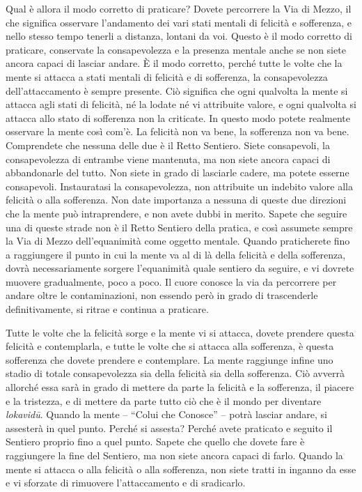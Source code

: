 Qual è allora il modo corretto di praticare? Dovete percorrere la Via di
Mezzo, il che significa osservare l'andamento dei vari stati mentali di
felicità e sofferenza, e nello stesso tempo tenerli a distanza, lontani
da voi. Questo è il modo corretto di praticare, conservate la
consapevolezza e la presenza mentale anche se non siete ancora capaci di
lasciar andare. È il modo corretto, perché tutte le volte che la mente
si attacca a stati mentali di felicità e di sofferenza, la
consapevolezza dell'attaccamento è sempre presente. Ciò significa che
ogni qualvolta la mente si attacca agli stati di felicità, né la lodate
né vi attribuite valore, e ogni qualvolta si attacca allo stato di
sofferenza non la criticate. In questo modo potete realmente osservare
la mente così com'è. La felicità non va bene, la sofferenza non va bene.
Comprendete che nessuna delle due è il Retto Sentiero. Siete
consapevoli, la consapevolezza di entrambe viene mantenuta, ma non siete
ancora capaci di abbandonarle del tutto. Non siete in grado di lasciarle
cadere, ma potete esserne consapevoli. Instauratasi la consapevolezza,
non attribuite un indebito valore alla felicità o alla sofferenza. Non
date importanza a nessuna di queste due direzioni che la mente può
intraprendere, e non avete dubbi in merito. Sapete che seguire una di
queste strade non è il Retto Sentiero della pratica, e così assumete
sempre la Via di Mezzo dell'equanimità come oggetto mentale. Quando
praticherete fino a raggiungere il punto in cui la mente va al di là
della felicità e della sofferenza, dovrà necessariamente sorgere
l'equanimità quale sentiero da seguire, e vi dovrete muovere
gradualmente, poco a poco. Il cuore conosce la via da percorrere per
andare oltre le contaminazioni, non essendo però in grado di
trascenderle definitivamente, si ritrae e continua a praticare.

Tutte le volte che la felicità sorge e la mente vi si attacca, dovete
prendere questa felicità e contemplarla, e tutte le volte che si attacca
alla sofferenza, è questa sofferenza che dovete prendere e contemplare.
La mente raggiunge infine uno stadio di totale consapevolezza sia della
felicità sia della sofferenza. Ciò avverrà allorché essa sarà in grado
di mettere da parte la felicità e la sofferenza, il piacere e la
tristezza, e di mettere da parte tutto ciò che è il mondo per diventare
\emph{lokavidū}. Quando la mente -- ``Colui che Conosce'' -- potrà
lasciar andare, si assesterà in quel punto. Perché si assesta? Perché
avete praticato e seguito il Sentiero proprio fino a quel punto. Sapete
che quello che dovete fare è raggiungere la fine del Sentiero, ma non
siete ancora capaci di farlo. Quando la mente si attacca o alla felicità
o alla sofferenza, non siete tratti in inganno da esse e vi sforzate di
rimuovere l'attaccamento e di sradicarlo.

